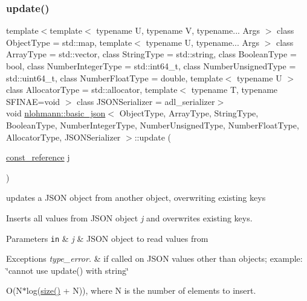 \subsubsection{\texorpdfstring{update()}{update()}\hspace{0.1cm}{\footnotesize\ttfamily [1/2]}}
{\footnotesize\ttfamily template$<$template$<$ typename U, typename V, typename... Args $>$ class Object\+Type = std\+::map, template$<$ typename U, typename... Args $>$ class Array\+Type = std\+::vector, class String\+Type  = std\+::string, class Boolean\+Type  = bool, class Number\+Integer\+Type  = std\+::int64\+\_\+t, class Number\+Unsigned\+Type  = std\+::uint64\+\_\+t, class Number\+Float\+Type  = double, template$<$ typename U $>$ class Allocator\+Type = std\+::allocator, template$<$ typename T, typename S\+F\+I\+N\+A\+E=void $>$ class J\+S\+O\+N\+Serializer = adl\+\_\+serializer$>$ \\
void \mbox{\hyperlink{classnlohmann_1_1basic__json}{nlohmann\+::basic\+\_\+json}}$<$ Object\+Type, Array\+Type, String\+Type, Boolean\+Type, Number\+Integer\+Type, Number\+Unsigned\+Type, Number\+Float\+Type, Allocator\+Type, J\+S\+O\+N\+Serializer $>$\+::update (\begin{DoxyParamCaption}\item[{\mbox{\hyperlink{classnlohmann_1_1basic__json_a4057c5425f4faacfe39a8046871786ca}{const\+\_\+reference}}}]{j }\end{DoxyParamCaption})\hspace{0.3cm}{\ttfamily [inline]}}



updates a J\+S\+ON object from another object, overwriting existing keys 

Inserts all values from J\+S\+ON object {\itshape j} and overwrites existing keys.


\begin{DoxyParams}[1]{Parameters}
\mbox{\tt in}  & {\em j} & J\+S\+ON object to read values from\\
\hline
\end{DoxyParams}

\begin{DoxyExceptions}{Exceptions}
{\em type\+\_\+error.} & if called on J\+S\+ON values other than objects; example\+: {\ttfamily \char`\"{}cannot use update() with string\char`\"{}}\\
\hline
\end{DoxyExceptions}
O(N$\ast$log(\mbox{\hyperlink{classnlohmann_1_1basic__json_a25e27ad0c6d53c01871c5485e1f75b96}{size()}} + N)), where N is the number of elements to insert.


